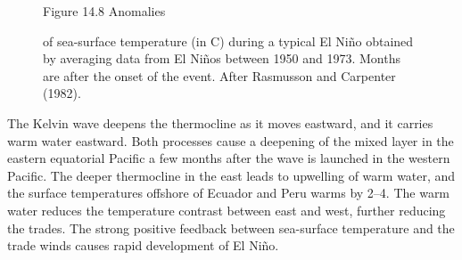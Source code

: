 \begin{figure}[p!]
\footnotesize
Figure 14.8 Anomalies
\rule{0pt}{3ex}of sea-surface temperature (in \degrees C) during a
typical El Ni\~{n}o obtained by averaging data from El Ni\~{n}os
between 1950 and 1973. Months are after the onset of the event. After
Rasmusson and Carpenter (1982).
\label{fig:elninoanomalies}
\vspace{-3ex}
\end{figure}

The Kelvin wave deepens the
thermocline as it moves eastward,
and it carries warm water eastward. Both processes cause a deepening
of the mixed layer in the
eastern equatorial Pacific a few months after the wave is launched in
the western Pacific. The deeper
thermocline in the east leads to
upwelling of warm water, and the surface
temperatures offshore of Ecuador and Peru warms by 2--4\degrees. The
warm water reduces the temperature contrast between east and west,
further reducing the trades. The strong positive feedback between
sea-surface temperature and the trade winds causes rapid development
of El Ni\~{n}o.

